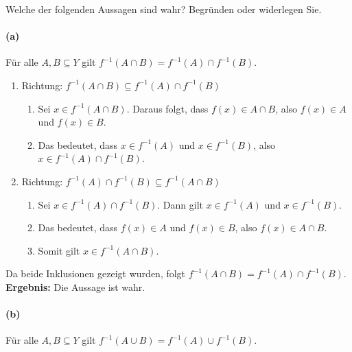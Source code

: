 \documentclass[12pt, letterpaper]{article}
\begin{document}
\noindent Welche der folgenden Aussagen sind wahr? Begründen oder widerlegen Sie.\\

\paragraph{(a)} Für alle $A, B \subseteq Y$ gilt $f^{-1}(A \cap B) = f^{-1}(A) \cap f^{-1}(B)$.

\begin{enumerate}
    \item Richtung: $f^{-1}(A \cap B) \subseteq f^{-1}(A) \cap f^{-1}(B)$
        \begin{enumerate}[label=$\circ$]
            \item Sei $x \in f^{-1}(A \cap B)$. Daraus folgt, dass $f(x) \in A \cap B$, also $f(x) \in A$ und $f(x) \in B$.
            \item Das bedeutet, dass $x \in f^{-1}(A)$ und $x \in f^{-1}(B)$, also $x \in f^{-1}(A) \cap f^{-1}(B)$.
        \end{enumerate}
    \item Richtung: $f^{-1}(A) \cap f^{-1}(B) \subseteq f^{-1}(A \cap B)$
        \begin{enumerate}[label=$\circ$]
            \item Sei $x \in f^{-1}(A) \cap f^{-1}(B)$. Dann gilt $x \in f^{-1}(A)$ und $x \in f^{-1}(B)$.
            \item Das bedeutet, dass $f(x) \in A$ und $f(x) \in B$, also $f(x) \in A \cap B$.
            \item Somit gilt $x \in f^{-1}(A \cap B)$.
        \end{enumerate}
\end{enumerate}

\noindent Da beide Inklusionen gezeigt wurden, folgt $f^{-1}(A \cap B) = f^{-1}(A) \cap f^{-1}(B)$. \\

\noindent\textbf{Ergebnis:} Die Aussage ist wahr.\\

\paragraph{(b)} Für alle $A, B \subseteq Y$ gilt $f^{-1}(A \cup B) = f^{-1}(A) \cup f^{-1}(B)$.
\end{document}
